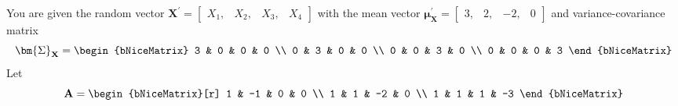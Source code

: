         You are given the random vector $\textbf{X}^\prime = \begin{bmatrix}
            X_1, & X_2, & X_3, & X_4
        \end{bmatrix}$ with the mean vector $\bm{\mu}_{\textbf{X}}^\prime = \begin{bmatrix}
            3, & 2, & -2, & 0
        \end{bmatrix}$ and variance-covariance matrix
        \[
            \bm{\Sigma}_{\textbf{X}}
            =
            \begin{bNiceMatrix}
                3 & 0 & 0 & 0 \\
                0 & 3 & 0 & 0 \\
                0 & 0 & 3 & 0 \\
                0 & 0 & 0 & 3
            \end{bNiceMatrix}
        \]
        Let
        \[
            \textbf{A}
            =
            \begin{bNiceMatrix}[r]
                1 & -1 & 0 & 0 \\
                1 & 1 & -2 & 0 \\
                1 & 1 & 1 & -3
            \end{bNiceMatrix}
        \]
